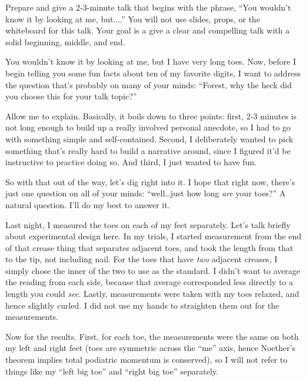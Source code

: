 \documentclass{fkpset}
\begin{document}
\begin{problem}[Prompt]
  Prepare and give a 2-3-minute talk that begins with the phrase, ``You wouldn't
  know it by looking at me, but....'' You will not use slides, props, or the
  whiteboard for this talk. Your goal is a give a clear and compelling talk with
  a solid beginning, middle, and end.
\end{problem}
\begin{solution}[Outline.]\setlength{\parindent}{1.5em}
  You wouldn't know it by looking at me, but I have very long toes. Now, before
  I begin telling you some fun facts about ten of my favorite digits, I want to
  address the question that's probably on many of your minds: ``Forest, why the
  heck did you choose this for your talk topic?''

  Allow me to explain. Basically, it boils down to three points: first, 2-3
  minutes is not long enough to build up a really involved personal anecdote, so
  I had to go with something simple and self-contained. Second, I deliberately
  wanted to pick something that's really hard to build a narrative around, since
  I figured it'd be instructive to practice doing so. And third, I just wanted
  to have fun.

  So with that out of the way, let's dig right into it. I hope that right now,
  there's just one question on all of your minds: ``well\ldots just how long
  \emph{are} your toes?'' A natural question. I'll do my best to answer it.

  Last night, I measured the toes on each of my feet separately. Let's talk
  briefly about experimental design here. In my trials, I started measurement
  from the end of that crease thing that separates adjacent toes, and took the
  length from that to the tip, not including nail. For the toes that have
  \emph{two} adjacent creases, I simply chose the inner of the two to use as the
  standard. I didn't want to average the reading from each side, because that
  average corresponded less directly to a length you could \emph{see}. Lastly,
  measurements were taken with my toes relaxed, and hence slightly curled. I did
  not use my hands to straighten them out for the measurements.

  Now for the results. First, for each toe, the measurements were the same on
  both my left and right feet (toes are symmetric across the ``me'' axis, hence
  Noether's theorem implies total podiatric momentum is conserved), so I will
  not refer to things like my ``left big toe'' and ``right big toe'' separately.


\end{solution}
\end{document}
